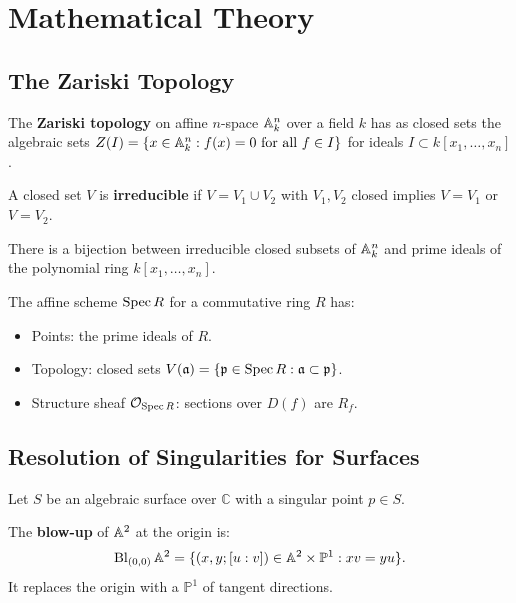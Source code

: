 \section{Mathematical Theory}

\subsection{The Zariski Topology}

\begin{definition}
The \textbf{Zariski topology} on affine $n$-space $\mathbb{A}^n_k$ over a field $k$ has as closed sets the algebraic sets $Z(I) = \{x \in \mathbb{A}^n_k : f(x) = 0 \text{ for all } f \in I\}$ for ideals $I \subset k[x_1,\dots,x_n]$.
\end{definition}

\begin{definition}
A closed set $V$ is \textbf{irreducible} if $V = V_1 \cup V_2$ with $V_1, V_2$ closed implies $V = V_1$ or $V = V_2$.
\end{definition}

\begin{theorem}[Correspondence]
There is a bijection between irreducible closed subsets of $\mathbb{A}^n_k$ and prime ideals of the polynomial ring $k[x_1,\dots,x_n]$.
\end{theorem}

\begin{definition}[Scheme]
The affine scheme $\operatorname{Spec} R$ for a commutative ring $R$ has:
\begin{itemize}
    \item Points: the prime ideals of $R$.
    \item Topology: closed sets $V(\mathfrak{a}) = \{\mathfrak{p} \in \operatorname{Spec} R : \mathfrak{a} \subset \mathfrak{p}\}$.
    \item Structure sheaf $\mathcal{O}_{\operatorname{Spec} R}$: sections over $D(f)$ are $R_f$.
\end{itemize}
\end{definition}

\subsection{Resolution of Singularities for Surfaces}

Let $S$ be an algebraic surface over $\mathbb{C}$ with a singular point $p \in S$.

\begin{definition}[Blow-up]
The \textbf{blow-up} of $\mathbb{A}^2$ at the origin is:
\[
\operatorname{Bl}_{(0,0)} \mathbb{A}^2 = \{(x,y; [u:v]) \in \mathbb{A}^2 \times \mathbb{P}^1 : xv = yu\}.
\]
It replaces the origin with a $\mathbb{P}^1$ of tangent directions.
\end{definition}

